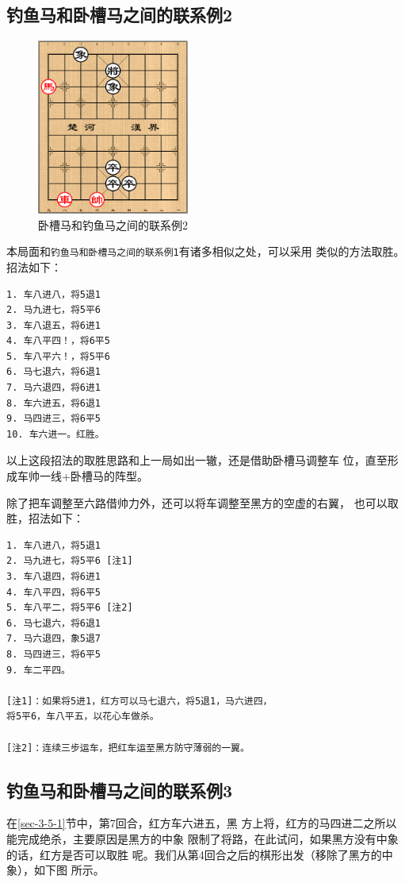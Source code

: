 \documentclass[a5paper,twoside]{book}
\begin{document}
\subsection{钓鱼马和卧槽马之间的联系例2}
\label{sec-3-5-2}
\begin{figure}[H]
\centering
\includegraphics[width=5cm]{pic/卧槽马和钓鱼马之间的联系又一例.png}
\caption{卧槽马和钓鱼马之间的联系例2}
\end{figure}


本局面和\texttt{钓鱼马和卧槽马之间的联系例1}有诸多相似之处，可以采用
类似的方法取胜。招法如下：

\begin{verbatim}
1. 车八进八，将5退1
2. 马九进七，将5平6
3. 车八退五，将6进1
4. 车八平四！，将6平5
5. 车八平六！，将5平6
6. 马七退六，将6退1
7. 马六退四，将6进1
8. 车六进五，将6退1
9. 马四进三，将6平5
10. 车六进一。红胜。
\end{verbatim}

以上这段招法的取胜思路和上一局如出一辙，还是借助卧槽马调整车
位，直至形成车帅一线+卧槽马的阵型。

除了把车调整至六路借帅力外，还可以将车调整至黑方的空虚的右翼，
也可以取胜，招法如下：

\begin{verbatim}
1. 车八进八，将5退1
2. 马九进七，将5平6 [注1]
3. 车八退四，将6进1
4. 车八平四，将6平5
5. 车八平二，将5平6 [注2]
6. 马七退六，将6退1
7. 马六退四，象5退7
8. 马四进三，将6平5
9. 车二平四。   
   
[注1]：如果将5进1，红方可以马七退六，将5退1，马六进四，
将5平6，车八平五，以花心车做杀。

[注2]：连续三步运车，把红车运至黑方防守薄弱的一翼。
\end{verbatim}

\subsection{钓鱼马和卧槽马之间的联系例3}
\label{sec-3-5-3}
在\ref{sec-3-5-1}节中，第7回合，红方车六进五，黑
方上将，红方的马四进二之所以能完成绝杀，主要原因是黑方的中象
限制了将路，在此试问，如果黑方没有中象的话，红方是否可以取胜
呢。我们从第4回合之后的棋形出发（移除了黑方的中象），如下图
所示。
\end{document}
